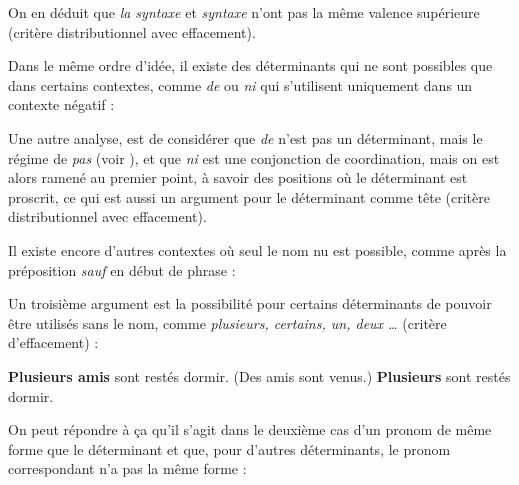 On en déduit que \textit{la syntaxe} et \textit{syntaxe} n’ont pas la même valence supérieure (critère distributionnel avec effacement).

Dans le même ordre d’idée, il existe des déterminants qui ne sont possibles que dans certains contextes, comme \textit{de} ou \textit{ni} qui s’utilisent uniquement dans un contexte négatif :

\ea
  \z
\z

Une autre analyse, est de considérer que \textit{de} n’est pas un déterminant, mais le régime de \textit{pas} (voir ), et que \textit{ni} est une conjonction de coordination, mais on est alors ramené au premier point, à savoir des positions où le déterminant est proscrit, ce qui est aussi un argument pour le déterminant comme tête (critère distributionnel avec effacement).

Il existe encore d’autres contextes où seul le nom nu est possible, comme après la préposition \textit{sauf} en début de phrase :

\ea
  \z
\z

Un troisième argument est la possibilité pour certains déterminants de pouvoir être utilisés sans le nom, comme \textit{plusieurs, certains, un, deux …} (critère d’effacement) :

\ea
  \ea \textbf{{Plusieurs amis}}  {sont restés dormir.}
  \ex ({Des amis sont venus.}) \textbf{{Plusieurs}}  {sont restés dormir.}
  \z
\z

On peut répondre à ça qu’il s’agit dans le deuxième cas d’un pronom de même forme que le déterminant et que, pour d’autres déterminants, le pronom correspondant n’a pas la même forme :

